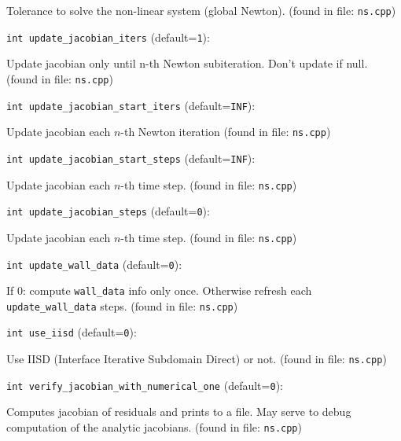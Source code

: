 Tolerance to solve the non-linear system (global Newton).
 (found in file: \verb+ns.cpp+)
\item\verb+int update_jacobian_iters+ {\rm(default=\verb|1|)}:

Update jacobian only until n-th Newton subiteration. 
Don't update if null. 
 (found in file: \verb+ns.cpp+)
\item\verb+int update_jacobian_start_iters+ {\rm(default=\verb|INF|)}:

Update jacobian each $n$-th Newton iteration
 (found in file: \verb+ns.cpp+)
\item\verb+int update_jacobian_start_steps+ {\rm(default=\verb|INF|)}:

Update jacobian each $n$-th time step. 
 (found in file: \verb+ns.cpp+)
\item\verb+int update_jacobian_steps+ {\rm(default=\verb|0|)}:

Update jacobian each $n$-th time step. 
 (found in file: \verb+ns.cpp+)
\item\verb+int update_wall_data+ {\rm(default=\verb|0|)}:

If 0: compute \verb+wall_data+ info only once. Otherwise
  refresh each \verb+update_wall_data+ steps. 
 (found in file: \verb+ns.cpp+)
\item\verb+int use_iisd+ {\rm(default=\verb|0|)}:

Use IISD (Interface Iterative Subdomain Direct) or not.
 (found in file: \verb+ns.cpp+)
\item\verb+int verify_jacobian_with_numerical_one+ {\rm(default=\verb|0|)}:

Computes jacobian of residuals and prints to a file.
 May serve to debug computation of the analytic jacobians. 
 (found in file: \verb+ns.cpp+)
